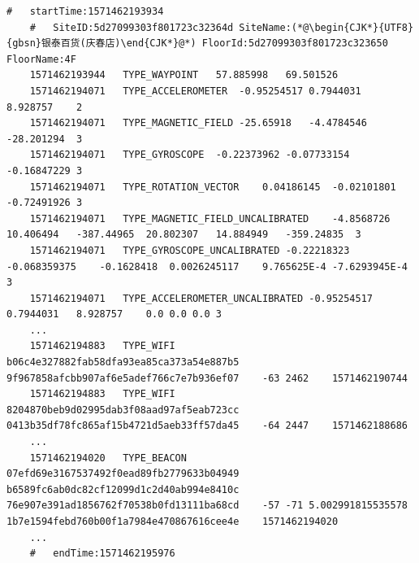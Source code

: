 \begin{lstlisting}[caption={A snippet of a file from the dataset},label={lst:dataset}]
    #	startTime:1571462193934
    #	SiteID:5d27099303f801723c32364d	SiteName:(*@\begin{CJK*}{UTF8}{gbsn}银泰百货(庆春店)\end{CJK*}@*) FloorId:5d27099303f801723c323650	FloorName:4F
    1571462193944	TYPE_WAYPOINT	57.885998	69.501526
    1571462194071	TYPE_ACCELEROMETER	-0.95254517	0.7944031	8.928757	2
    1571462194071	TYPE_MAGNETIC_FIELD	-25.65918	-4.4784546	-28.201294	3
    1571462194071	TYPE_GYROSCOPE	-0.22373962	-0.07733154	-0.16847229	3
    1571462194071	TYPE_ROTATION_VECTOR	0.04186145	-0.02101801	-0.72491926	3
    1571462194071	TYPE_MAGNETIC_FIELD_UNCALIBRATED	-4.8568726	10.406494	-387.44965	20.802307	14.884949	-359.24835	3
    1571462194071	TYPE_GYROSCOPE_UNCALIBRATED	-0.22218323	-0.068359375	-0.1628418	0.0026245117	9.765625E-4	-7.6293945E-4	3
    1571462194071	TYPE_ACCELEROMETER_UNCALIBRATED	-0.95254517	0.7944031	8.928757	0.0	0.0	0.0	3
    ...
    1571462194883	TYPE_WIFI	b06c4e327882fab58dfa93ea85ca373a54e887b5	9f967858afcbb907af6e5adef766c7e7b936ef07	-63	2462	1571462190744
    1571462194883	TYPE_WIFI	8204870beb9d02995dab3f08aad97af5eab723cc	0413b35df78fc865af15b4721d5aeb33ff57da45	-64	2447	1571462188686
    ...
    1571462194020	TYPE_BEACON	07efd69e3167537492f0ead89fb2779633b04949	b6589fc6ab0dc82cf12099d1c2d40ab994e8410c	76e907e391ad1856762f70538b0fd13111ba68cd	-57	-71	5.002991815535578	1b7e1594febd760b00f1a7984e470867616cee4e	1571462194020
    ...
    #	endTime:1571462195976
\end{lstlisting}




